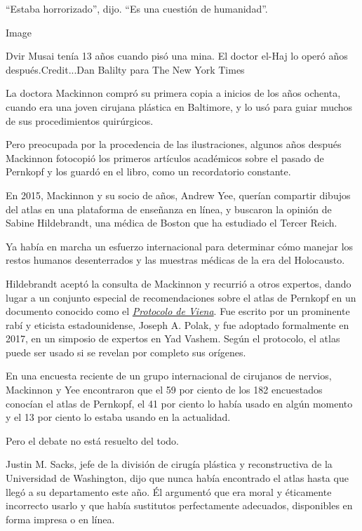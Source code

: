 ``Estaba horrorizado'', dijo. ``Es una cuestión de humanidad''.

Image

Dvir Musai tenía 13 años cuando pisó una mina. El doctor el-Haj lo operó
años después.Credit...Dan Balilty para The New York Times

La doctora Mackinnon compró su primera copia a inicios de los años
ochenta, cuando era una joven cirujana plástica en Baltimore, y lo usó
para guiar muchos de sus procedimientos quirúrgicos.

Pero preocupada por la procedencia de las ilustraciones, algunos años
después Mackinnon fotocopió los primeros artículos académicos sobre el
pasado de Pernkopf y los guardó en el libro, como un recordatorio
constante.

En 2015, Mackinnon y su socio de años, Andrew Yee, querían compartir
dibujos del atlas en una plataforma de enseñanza en línea, y buscaron la
opinión de Sabine Hildebrandt, una médica de Boston que ha estudiado el
Tercer Reich.

Ya había en marcha un esfuerzo internacional para determinar cómo
manejar los restos humanos desenterrados y las muestras médicas de la
era del Holocausto.

Hildebrandt aceptó la consulta de Mackinnon y recurrió a otros expertos,
dando lugar a un conjunto especial de recomendaciones sobre el atlas de
Pernkopf en un documento conocido como el
\href{https://www.bu.edu/jewishstudies/files/2018/08/HOW-TO-DEAL-WITH-HOLOCAUST-ERA-REMAINS.FINAL_.pdf}{\emph{Protocolo
de Viena}}. Fue escrito por un prominente rabí y eticista
estadounidense, Joseph A. Polak, y fue adoptado formalmente en 2017, en
un simposio de expertos en Yad Vashem. Según el protocolo, el atlas
puede ser usado si se revelan por completo sus orígenes.

En una encuesta reciente de un grupo internacional de cirujanos de
nervios, Mackinnon y Yee encontraron que el 59 por ciento de los 182
encuestados conocían el atlas de Pernkopf, el 41 por ciento lo había
usado en algún momento y el 13 por ciento lo estaba usando en la
actualidad.

Pero el debate no está resuelto del todo.

Justin M. Sacks, jefe de la división de cirugía plástica y
reconstructiva de la Universidad de Washington, dijo que nunca había
encontrado el atlas hasta que llegó a su departamento este año. Él
argumentó que era moral y éticamente incorrecto usarlo y que había
sustitutos perfectamente adecuados, disponibles en forma impresa o en
línea.

